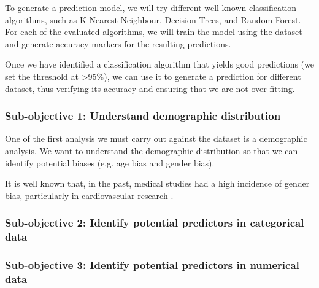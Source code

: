 To generate a prediction model, we will try different well-known classification algorithms, such as K-Nearest Neighbour, 
Decision Trees, and Random Forest. For each of the evaluated algorithms, we will train the model using the dataset and
generate accuracy markers for the resulting predictions.

Once we have identified a classification algorithm that yields good predictions (we set the threshold at >95\%), we can
use it to generate a prediction for different dataset, thus verifying its accuracy and ensuring that we are not over-fitting.

\subsubsection{Sub-objective 1: Understand demographic distribution}

One of the first analysis we must carry out against the dataset is a demographic analysis. We want to understand
the demographic distribution so that we can identify potential biases (e.g. age bias and gender bias).

It is well known that, in the past, medical studies had a high incidence of gender bias, particularly in cardiovascular
research \cite{GenderBiasCardiovascularResearch}.

\subsubsection{Sub-objective 2: Identify potential predictors in categorical data}

\subsubsection{Sub-objective 3: Identify potential predictors in numerical data}

